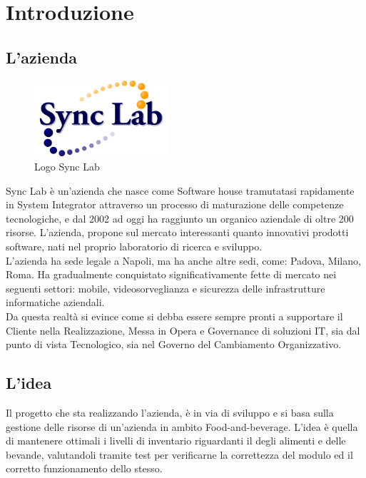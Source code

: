 
\chapter{Introduzione}
\section{L'azienda}
\begin{figure}[H]
	\begin{center} \includegraphics[width=5cm]{figures/logo_synclab}
		\caption[Logo Sync Lab]{Logo Sync Lab} 
		\label{logo_python} 
	\end{center}
\end{figure}
Sync Lab è un'azienda che nasce come Software house tramutatasi rapidamente in System Integrator attraverso un processo di maturazione delle competenze tecnologiche, e dal 2002 ad oggi ha raggiunto un organico aziendale di oltre 200 risorse.
L'azienda, propone sul mercato interessanti quanto innovativi prodotti software, nati nel proprio laboratorio di ricerca e sviluppo.\\
L'azienda ha sede legale a Napoli, ma ha anche altre sedi, come: Padova, Milano, Roma. 
Ha gradualmente conquistato significativamente fette di mercato nei seguenti settori: mobile, videosorveglianza e sicurezza delle infrastrutture informatiche aziendali.\\
Da questa realtà si evince come si debba essere sempre pronti a supportare il Cliente nella Realizzazione, Messa in Opera e Governance di soluzioni IT, sia dal punto di vista Tecnologico, sia nel Governo del Cambiamento Organizzativo.

\section{L'idea}
Il progetto che sta realizzando l'azienda, è in via di sviluppo e si basa sulla gestione delle risorse di un'azienda in ambito Food-and-beverage.
L'idea è quella di mantenere ottimali i livelli di inventario riguardanti il  degli alimenti e delle bevande, valutandoli tramite test per verificarne la correttezza del modulo ed il corretto funzionamento dello stesso.

